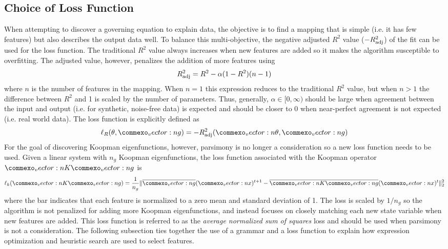 \documentclass{article}
\renewcommand{\vec}[1]{\vect{#1}}
\newcommand{\mat}[1]{\vect{#1}}
\begin{document}
\subsection{Choice of Loss Function}
\label{lossfunction}
When attempting to discover a governing equation to explain data, the objective is to find a mapping that is simple (i.e. it has few features) but also describes the output data well. To balance this multi-objective, the negative adjusted $R^2$ value ($-R_{\rm adj}^2$) of the fit can be used for the loss function. The traditional $R^2$ value always increases when new features are added so it makes the algorithm susceptible to overfitting. The adjusted value, however, penalizes the addition of more features using
\begin{equation} 
R_{\rm adj}^2 = R^2 - \alpha (1-  R^2)(n-1)
\end{equation}
where $n$ is the number of features in the mapping. When $n=1$ this expression reduces to the traditional $R^2$ value, but when $n>1$ the difference between $R^2$ and 1 is scaled by the number of parameters. Thus, generally, $\alpha \in [0, \infty)$ should be large when agreement between the input and output (i.e. for synthetic, noise-free data) is expected and should be closer to 0 when near-perfect agreement is not expected (i.e. real world data). The loss function is explicitly defined as 
\begin{equation}
    \ell_R(\theta, \vec{g}) = - R_{\rm adj}^2(\vec{\theta}, \vec{g})
\end{equation}
For the goal of discovering Koopman eigenfunctions, however, parsimony is no longer a consideration so a new loss function needs to be used. Given a linear system with $n_g$ Koopman eigenfunctions, the loss function associated with the Koopman operator $\mat{K} \vec{g}$ is
\begin{equation} \ell_k(\mat{K} \vec{g}) = \frac{1}{n_g}\lVert \overline{\vec{g}}(\vec{x})^{t+1} - \overline{\mat{K} \vec{g}}(\vec{x})^{t}\rVert _2^2 \end{equation}
where the bar indicates that each feature is normalized to a zero mean and standard deviation of 1. The loss is scaled by $1/n_g$ so the algorithm is not penalized for adding more Koopman eigenfunctions, and instead focuses on closely matching each new state variable when new features are added. This loss function is referred to as the \emph{average normalized sum of squares} loss and should be used when parsimony is not a consideration. The following subsection ties together the use of a grammar and a loss function to explain how expression optimization and heuristic search are used to select features.
\end{document}
